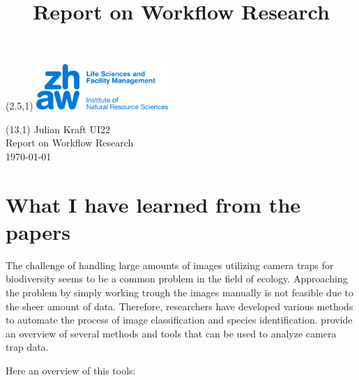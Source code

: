 \documentclass{article}
\title{Report on Workflow Research}
\makeatletter
\renewcommand{\maketitle}{
  \begin{flushleft} 
    \Large\textmd{\@title} 
    \par
  \end{flushleft}
}
\makeatother
\begin{document}
\begin{textblock}{5}(2.5,1) %
  \includegraphics[width=5cm]{logo.jpg} %
\end{textblock}

\begin{textblock}{6}(13,1) %
        \raggedleft
        Julian Kraft UI22\\
        Report on Workflow Research\\
        \today
\end{textblock}

\vspace*{1.5cm}


\maketitle


\section*{What I have learned from the papers}

The challenge of handling large amounts of images utilizing camera traps for biodiversity seems to be a common problem in the field of ecology.
Approaching the problem by simply working trough the images manually is not feasible due to the sheer amount of data.
Therefore, researchers have developed various methods to automate the process of image classification and species identification.
\textcite{velezChoosingAppropriatePlatform2022} provide an overview of several methods and tools that can be used to analyze camera trap data.

Here an overview of this tools:
\end{document}

